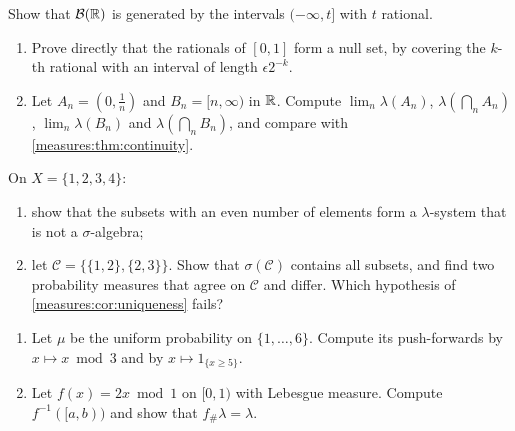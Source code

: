 \begin{notechapter}
\begin{exercise}\label{measures:exr:2}
Show that $\mathcal B(\mathbb{R})$ is generated by the intervals
$(-\infty, t]$ with $t$ rational.
\end{exercise}

\begin{exercise}\label{measures:exr:3}
\begin{enumerate}[nosep]
  \item Prove directly that the rationals of $[0, 1]$ form a null set,
        by covering the $k$-th rational with an interval of length
        $\epsilon2^{-k}$.
  \item Let $A_n = (0, \frac1n)$ and $B_n = [n, \infty)$ in $\mathbb{R}$. Compute
        $\lim_n\lambda(A_n)$, $\lambda(\bigcap_nA_n)$,
        $\lim_n\lambda(B_n)$ and $\lambda(\bigcap_nB_n)$, and compare
        with \cref{measures:thm:continuity}.
\end{enumerate}
\end{exercise}

\begin{exercise}\label{measures:exr:4}
On $X = \{1, 2, 3, 4\}$:
\begin{enumerate}[nosep]
  \item show that the subsets with an even number of elements form a
        $\lambda$-system that is not a $\sigma$-algebra;
  \item let $\mathcal C = \{\{1, 2\}, \{2, 3\}\}$. Show that
        $\sigma(\mathcal C)$ contains all subsets, and find two
        probability measures that agree on $\mathcal C$ and differ.
        Which hypothesis of \cref{measures:cor:uniqueness} fails?
\end{enumerate}
\end{exercise}

\begin{exercise}\label{measures:exr:5}
\begin{enumerate}[nosep]
  \item Let $\mu$ be the uniform probability on $\{1,\dots,6\}$. Compute
        its push-forwards by $x\mapsto x\bmod3$ and by
        $x\mapsto1_{\{x\geq5\}}$.
  \item Let $f(x) = 2x\bmod1$ on $[0, 1)$ with Lebesgue measure. Compute
        $f^{-1}([a, b))$ and show that $f_\#\lambda = \lambda$.
\end{enumerate}
\end{exercise}


\end{notechapter}
